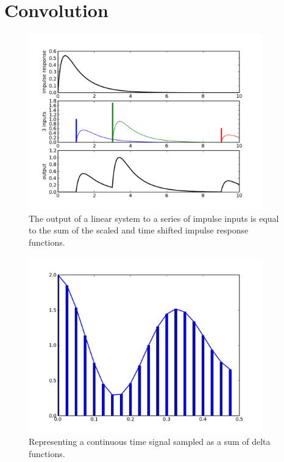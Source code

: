 \section{Convolution}
\label{sec:convolution}


\begin{center}%
\begin{figure}
\begin{centering}\includegraphics[width=4in]{fig/convolve_explain}\par\end{centering}
\caption{\label{fig:convolve_explain}The output of a linear system to a series of impulse inputs is equal to the sum of the scaled and time shifted impulse response functions.}
\end{figure}
\par\end{center}

\begin{center}%
\begin{figure}
\begin{centering}\includegraphics[width=4in]{fig/convolve_deltas}\par\end{centering}
\caption{\label{fig:convolve_deltas}Representing a continuous time signal sampled as a sum of delta functions.}
\end{figure}
\par\end{center}


